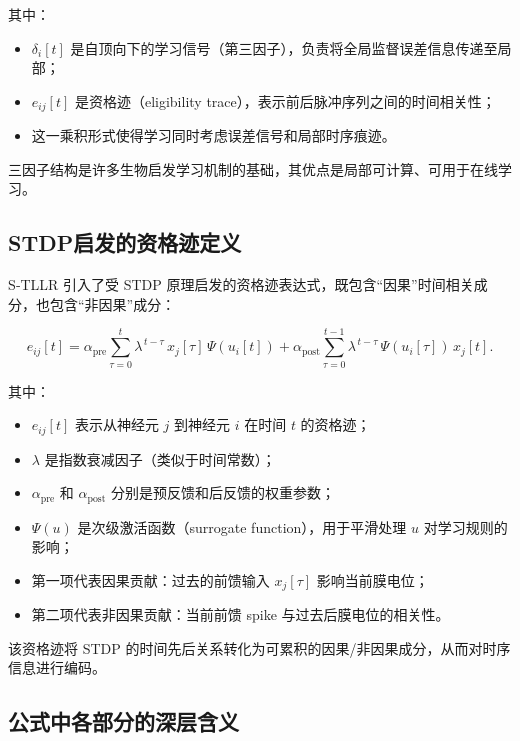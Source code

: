 \documentclass[journal,12pt,onecolumn]{IEEEtran}
\begin{document}
其中：
\begin{itemize}
    \item $\delta_i[t]$ 是自顶向下的学习信号（第三因子），负责将全局监督误差信息传递至局部；
    \item $e_{ij}[t]$ 是资格迹（eligibility trace），表示前后脉冲序列之间的时间相关性；
    \item 这一乘积形式使得学习同时考虑误差信号和局部时序痕迹。
\end{itemize}

三因子结构是许多生物启发学习机制的基础，其优点是局部可计算、可用于在线学习。

\subsection{STDP启发的资格迹定义}

S‑TLLR 引入了受 STDP 原理启发的资格迹表达式，既包含“因果”时间相关成分，也包含“非因果”成分：

\begin{equation}
e_{ij}[t] =
\alpha_{\text{pre}} \sum_{\tau=0}^{t} \lambda^{\,t-\tau} \, x_j[\tau] \, \Psi(u_i[t])
+
\alpha_{\text{post}} \sum_{\tau=0}^{t-1} \lambda^{\,t-\tau} \, \Psi(u_i[\tau]) \, x_j[t].
\label{eq:stllr_eligibility}
\end{equation}

其中：
\begin{itemize}
    \item $e_{ij}[t]$ 表示从神经元 $j$ 到神经元 $i$ 在时间 $t$ 的资格迹；
    \item $\lambda$ 是指数衰减因子（类似于时间常数）；
    \item $\alpha_{\text{pre}}$ 和 $\alpha_{\text{post}}$ 分别是预反馈和后反馈的权重参数；
    \item $\Psi(u)$ 是次级激活函数（surrogate function），用于平滑处理 $u$ 对学习规则的影响；
    \item 第一项代表因果贡献：过去的前馈输入 $x_j[\tau]$ 影响当前膜电位；
    \item 第二项代表非因果贡献：当前前馈 spike 与过去后膜电位的相关性。
\end{itemize}

该资格迹将 STDP 的时间先后关系转化为可累积的因果/非因果成分，从而对时序信息进行编码。

\subsection{公式中各部分的深层含义}
\end{document}
